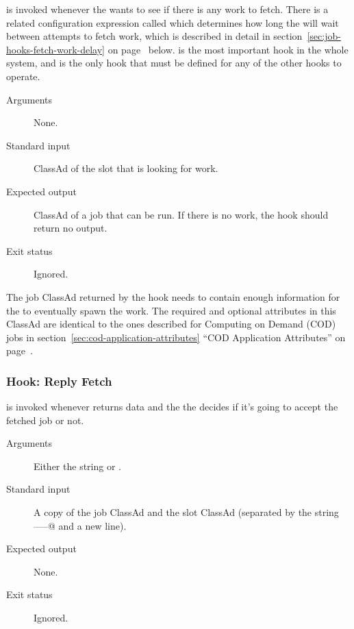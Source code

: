  is invoked whenever the 
wants to see if there is any work to fetch.
There is a related configuration expression called
 which determines how long the 
will wait between attempts to fetch work, which is described in detail
in section~\ref{sec:job-hooks-fetch-work-delay} on
page~\pageref{sec:job-hooks-fetch-work-delay} below.
 is the most important hook in the whole
system, and is the only hook that must be defined for any of the other
 hooks to operate.

\begin{description}
\item[Arguments]
  None.

\item[Standard input]
  ClassAd of the slot that is looking for work.

\item[Expected output]
  ClassAd of a job that can be run.
  If there is no work, the hook should return no output.

\item[Exit status]
  Ignored.
\end{description}

The job ClassAd returned by the hook needs to contain enough
information for the  to eventually spawn the work.
The required and optional attributes in this ClassAd are identical to
the ones described for Computing on Demand (COD) jobs in
section~\ref{sec:cod-application-attributes} 
``COD Application Attributes'' on
page~\pageref{sec:cod-application-attributes}.


\subsubsection{\label{sec:job-hooks-reply-fetch}
Hook: Reply Fetch}

 is invoked whenever
 returns data and the the 
decides if it's going to accept the fetched job or not.

\begin{description}
\item[Arguments]
  Either the string \verb@accept@ or \verb@reject@.

\item[Standard input]
  A copy of the job ClassAd and the slot ClassAd
  (separated by the string \verb@-----@ and a new line).

\item[Expected output]
  None.

\item[Exit status]
  Ignored.
\end{description}

